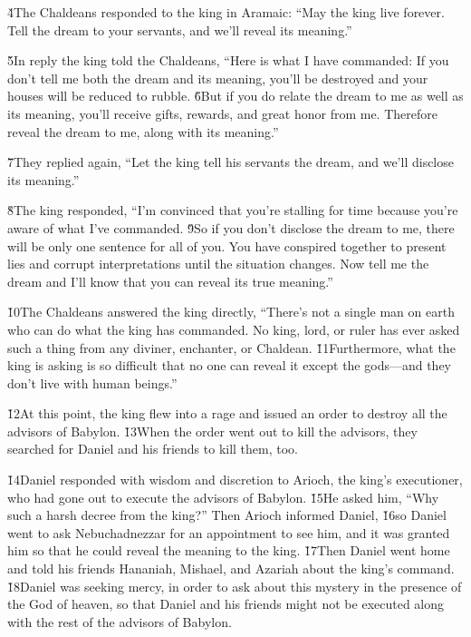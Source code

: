\v{4}The Chaldeans responded to the king in Aramaic: ``May the king live forever. Tell the dream to your servants, and we'll reveal its meaning.''

\v{5}In reply the king told the Chaldeans, ``Here is what I have commanded: If you don't tell me both the dream and its meaning, you'll be destroyed and your houses will be reduced to rubble. \v{6}But if you do relate the dream to me as well as its meaning, you'll receive gifts, rewards, and great honor from me. Therefore reveal the dream to me, along with its meaning.''

\v{7}They replied again, ``Let the king tell his servants the dream, and we'll disclose its meaning.''

\v{8}The king responded, ``I'm convinced that you're stalling for time because you're aware of what I've commanded. \v{9}So if you don't disclose the dream to me, there will be only one sentence for all of you. You have conspired together to present lies and corrupt interpretations until the situation changes. Now tell me the dream and I'll know that you can reveal its true meaning.''

\v{10}The Chaldeans answered the king directly, ``There's not a single man on earth who can do what the king has commanded. No king, lord, or ruler has ever asked such a thing from any diviner, enchanter, or Chaldean. \v{11}Furthermore, what the king is asking is so difficult that no one can reveal it except the gods---and they don't live with human beings.''

\v{12}At this point, the king flew into a rage and issued an order to destroy all the advisors of Babylon. \v{13}When the order went out to kill the advisors, they searched for Daniel and his friends to kill them, too.

\v{14}Daniel responded with wisdom and discretion to Arioch, the king's executioner, who had gone out to execute the advisors of Babylon. \v{15}He asked him, ``Why such a harsh decree from the king?'' Then Arioch informed Daniel, \v{16}so Daniel went to ask Nebuchadnezzar for an appointment to see him, and it was granted him so that he could reveal the meaning to the king. \v{17}Then Daniel went home and told his friends Hananiah, Mishael, and Azariah about the king's command. \v{18}Daniel was seeking mercy, in order to ask about this mystery in the presence of the God of heaven, so that Daniel and his friends might not be executed along with the rest of the advisors of Babylon.


